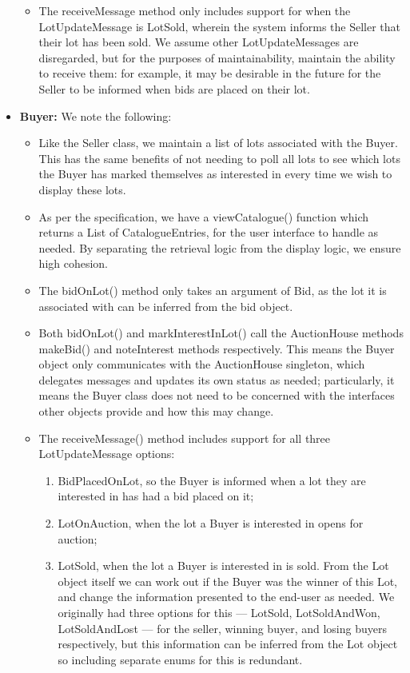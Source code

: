 \documentclass[titlepage, 12pt]{extarticle}
\begin{document}
\begin{itemize}
\begin{itemize}
  \item The receiveMessage method only includes support for when the LotUpdateMessage is LotSold, wherein the system informs the Seller that their lot has been sold. We assume other LotUpdateMessages are disregarded, but for the purposes of maintainability, maintain the ability to receive them: for example, it may be desirable in the future for the Seller to be informed when bids are placed on their lot. 
  \end{itemize}
\item {\bf Buyer: } We note the following:
  \begin{itemize}
  \item Like the Seller class, we maintain a list of lots associated with the Buyer. This has the same benefits of not needing to poll all lots to see which lots the Buyer has marked themselves as interested in every time we wish to display these lots.
  \item As per the specification, we have a viewCatalogue() function which returns a List of CatalogueEntries, for the user interface to handle as needed. By separating the retrieval logic from the display logic, we ensure high cohesion. 
  \item The bidOnLot() method only takes an argument of Bid, as the lot it is associated with can be inferred from the bid object.
  \item Both bidOnLot() and markInterestInLot() call the AuctionHouse methods makeBid() and noteInterest methods respectively. This means the Buyer object only communicates with the AuctionHouse singleton, which delegates messages and updates its own status as needed; particularly, it means the Buyer class does not need to be concerned with the interfaces other objects provide and how this may change. 
  \item The receiveMessage() method includes support for all three LotUpdateMessage options:
    \begin{enumerate}
      \item BidPlacedOnLot, so the Buyer is informed when a lot they are interested in has had a bid placed on it;
      \item LotOnAuction, when the lot a Buyer is interested in opens for auction;
      \item LotSold, when the lot a Buyer is interested in is sold. From the Lot object itself we can work out if the Buyer was the winner of this Lot, and change the information presented to the end-user as needed. We originally had three options for this --- LotSold, LotSoldAndWon, LotSoldAndLost --- for the seller, winning buyer, and losing buyers respectively, but this information can be inferred from the Lot object so including separate enums for this is redundant. 

\end{enumerate}
\end{itemize}
\end{itemize}
\end{document}
